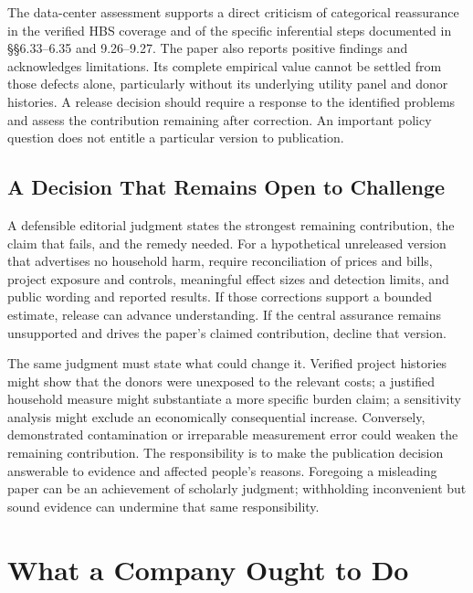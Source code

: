 The data-center assessment supports a direct criticism of categorical
reassurance in the verified HBS coverage and of the specific inferential
steps documented in §§6.33--6.35 and 9.26--9.27. The paper also reports
positive findings and acknowledges limitations. Its complete empirical
value cannot be settled from those defects alone, particularly without
its underlying utility panel and donor histories. A release decision
should require a response to the identified problems and assess the
contribution remaining after correction. An important policy question
does not entitle a particular version to publication.

\hypertarget{M09-a-decision-that-remains-open-to-challenge}{%
\subsection{A Decision That Remains Open to
Challenge}\label{M09-a-decision-that-remains-open-to-challenge}}

\noindent \noindent A defensible editorial judgment states the strongest remaining
contribution, the claim that fails, and the remedy needed. For a
hypothetical unreleased version that advertises no household harm,
require reconciliation of prices and bills, project exposure and
controls, meaningful effect sizes and detection limits, and public
wording and reported results. If those corrections support a bounded
estimate, release can advance understanding. If the central assurance
remains unsupported and drives the paper's claimed contribution, decline
that version.

The same judgment must state what could change it. Verified project
histories might show that the donors were unexposed to the relevant
costs; a justified household measure might substantiate a more specific
burden claim; a sensitivity analysis might exclude an economically
consequential increase. Conversely, demonstrated contamination or
irreparable measurement error could weaken the remaining contribution.
The responsibility is to make the publication decision answerable to
evidence and affected people's reasons. Foregoing a misleading paper can
be an achievement of scholarly judgment; withholding inconvenient but
sound evidence can undermine that same responsibility.


\hypertarget{M09-what-a-company-ought-to-do}{%
\section{What a Company Ought to
Do}\label{M09-what-a-company-ought-to-do}}

